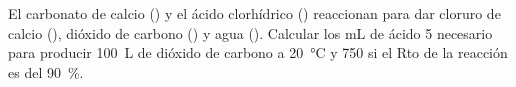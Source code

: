 El carbonato de calcio () y el ácido clorhídrico () reaccionan para dar cloruro de calcio (), dióxido de carbono () y agua (). Calcular los \si{\milli\liter} de ácido \SI{5}{\Molar} necesario para producir \SI{100}{\liter} de dióxido de carbono a \SI{20}{\celsius} y \SI{750}{\torr} si el Rto de la reacción es del \SI{90}{\percent}.
